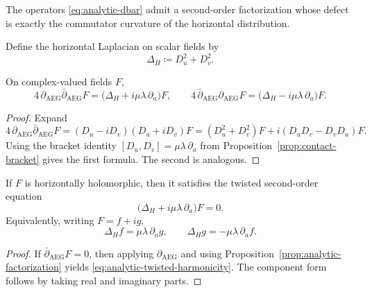 The operators \eqref{eq:analytic-dbar} admit a second-order factorization whose defect is exactly the commutator curvature of the horizontal distribution.

\begin{definition}\label{def:analytic-horizontal-laplacian}
Define the horizontal Laplacian on scalar fields by
\begin{equation}\label{eq:analytic-deltaH}
\Delta_H\coloneqq D_u^2+D_v^2.
\end{equation}
\end{definition}

\begin{proposition}[Factorization]\label{prop:analytic-factorization}
On complex-valued fields $F$,
\begin{equation}\label{eq:analytic-factorization}
4\,\partial_{\mathrm{AEG}}\bar\partial_{\mathrm{AEG}}F
=\bigl(\Delta_H+i\mu\lambda\,\partial_a\bigr)F,
\qquad
4\,\bar\partial_{\mathrm{AEG}}\partial_{\mathrm{AEG}}F
=\bigl(\Delta_H-i\mu\lambda\,\partial_a\bigr)F.
\end{equation}
\end{proposition}

\begin{proof}
Expand
\[
4\,\partial_{\mathrm{AEG}}\bar\partial_{\mathrm{AEG}}F
=(D_u-iD_v)(D_u+iD_v)F
=(D_u^2+D_v^2)F+i(D_uD_v-D_vD_u)F.
\]
Using the bracket identity $[D_u,D_v]=\mu\lambda\,\partial_a$ from Proposition~\ref{prop:contact-bracket} gives the first formula. The second is analogous.
\end{proof}

\begin{theorem}\label{thm:analytic-twisted-harmonicity}
If $F$ is horizontally holomorphic, then it satisfies the twisted second-order equation
\begin{equation}\label{eq:analytic-twisted-harmonicity}
\bigl(\Delta_H+i\mu\lambda\,\partial_a\bigr)F=0.
\end{equation}
Equivalently, writing $F=f+ig$,
\begin{equation}\label{eq:analytic-twisted-components}
\Delta_H f=\mu\lambda\,\partial_a g,
\qquad
\Delta_H g=-\mu\lambda\,\partial_a f.
\end{equation}
\end{theorem}

\begin{proof}
If $\bar\partial_{\mathrm{AEG}}F=0$, then applying $\partial_{\mathrm{AEG}}$ and using Proposition~\ref{prop:analytic-factorization} yields \eqref{eq:analytic-twisted-harmonicity}. The component form follows by taking real and imaginary parts.
\end{proof}

